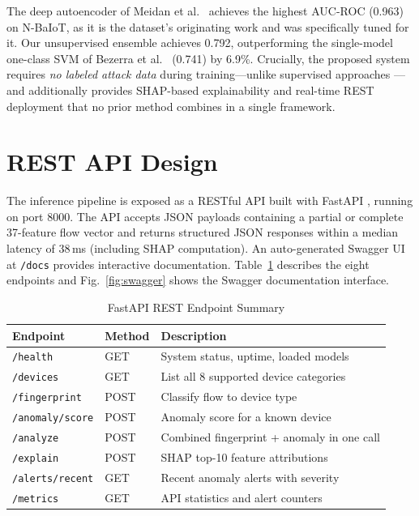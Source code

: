 \documentclass[conference]{IEEEtran}
\begin{document}
The deep autoencoder of Meidan et al.\ \cite{meidan2018nbaiot} achieves
the highest AUC-ROC (0.963) on N-BaIoT, as it is the dataset's
originating work and was specifically tuned for it. Our unsupervised
ensemble achieves 0.792, outperforming the single-model one-class SVM
of Bezerra et al.\ \cite{bezerra2019iotds} (0.741) by 6.9\%. Crucially,
the proposed system requires \textit{no labeled attack data} during
training---unlike supervised approaches \cite{doshi2018machine}---and
additionally provides SHAP-based explainability and real-time REST
deployment that no prior method combines in a single framework.

\section{REST API Design}
\label{sec:api}

The inference pipeline is exposed as a RESTful API built with FastAPI
\cite{ramirez2019fastapi}, running on port 8000. The API accepts JSON
payloads containing a partial or complete 37-feature flow vector and returns
structured JSON responses within a median latency of 38\,ms (including SHAP
computation). An auto-generated Swagger UI at \texttt{/docs} provides
interactive documentation. Table~\ref{tab:api} describes the eight endpoints
and Fig.~\ref{fig:swagger} shows the Swagger documentation interface.

\begin{table}[htbp]
\caption{FastAPI REST Endpoint Summary}
\label{tab:api}
\centering
\renewcommand{\arraystretch}{1.2}
\begin{tabular}{l l p{3.6cm}}
\toprule
\textbf{Endpoint}      & \textbf{Method} & \textbf{Description} \\
\midrule
\texttt{/health}          & GET  & System status, uptime, loaded models \\
\texttt{/devices}         & GET  & List all 8 supported device categories \\
\texttt{/fingerprint}     & POST & Classify flow to device type \\
\texttt{/anomaly/score}   & POST & Anomaly score for a known device \\
\texttt{/analyze}         & POST & Combined fingerprint + anomaly in one call \\
\texttt{/explain}         & POST & SHAP top-10 feature attributions \\
\texttt{/alerts/recent}   & GET  & Recent anomaly alerts with severity \\
\texttt{/metrics}         & GET  & API statistics and alert counters \\
\bottomrule
\end{tabular}
\end{table}
\end{document}
